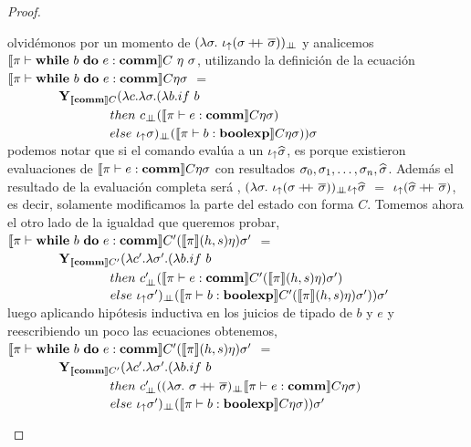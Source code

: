 \begin{proof}
\begin{itemize}
\begin{itemize}
olvid\'emonos por un momento de $(\lambda \sigma. \ \iota_{\uparrow} (\sigma +\kern-1.3ex+\kern0.8ex \overline{\sigma}))_{\bot \!\!\! \bot}$
y analicemos $\llbracket \pi \vdash \textbf{while} \ b \ \textbf{do} \ e : \textbf{comm} \rrbracket C \ \eta \ \sigma$, utilizando
la definici\'on de la ecuaci\'on\\

$\llbracket \pi \vdash \textbf{while} \ b \ \textbf{do} \ e : \textbf{comm} \rrbracket C \eta \sigma$ $=$ \\
\indent \ \ \ \ \ \ \ \
$\textbf{Y}_{\llbracket \textbf{comm} \rrbracket C} (\lambda c . \lambda \sigma . (\lambda b . if \ b$ \\
\indent \ \ \ \ \ \ \ \ \ \ \ \ \ \ \ \
$then \ c_{\dbot}(\semBrcks{\pi \vdash e : \commt}C \eta \sigma)$ \\
\indent \ \ \ \ \ \ \ \ \ \ \ \ \ \ \ \
$else \ \iota_{\uparrow} \sigma)_{\bot \!\!\! \bot} (\llbracket \pi \vdash b : \textbf{boolexp} \rrbracket C\eta\sigma))\sigma$ \\

podemos notar que si el comando eval\'ua a un $\iota_{\uparrow}\widehat{\sigma}$, es porque 
existieron evaluaciones de $\llbracket \pi \vdash e : \textbf{comm} \rrbracket C \eta \sigma$
con resultados $\sigma_0, \sigma_1, \ldots, \sigma_n, \widehat{\sigma}$. Adem\'as 
el resultado de la evaluaci\'on completa ser\'a ,
$(\lambda \sigma. \ \iota_{\uparrow} (\sigma +\kern-1.3ex+\kern0.8ex \overline{\sigma}))_{\bot \!\!\! \bot} \iota_{\uparrow} \widehat{\sigma}$ $=$
$\iota_{\uparrow} (\widehat{\sigma} +\kern-1.3ex+\kern0.8ex \overline{\sigma})$, es decir, solamente modificamos la parte del estado
con forma $C$. Tomemos ahora el otro lado de la igualdad que queremos probar,\\

$\llbracket \pi \vdash \textbf{while} \ b \ \textbf{do} \ e : \textbf{comm} \rrbracket C' (\llbracket \pi \rrbracket(h,s)\eta) \sigma'$ $=$ \\
\indent \ \ \ \ \ \ \ \
$\textbf{Y}_{\llbracket \textbf{comm} \rrbracket C'} (\lambda c' . \lambda \sigma' . (\lambda b . if \ b$ \\
\indent \ \ \ \ \ \ \ \ \ \ \ \ \ \ \ \
$then \ c'_{\dbot}(\semBrcks{\pi \vdash e : \commt}C'(\semBrcks{\pi}(h,s)\eta) \sigma')$ \\
\indent \ \ \ \ \ \ \ \ \ \ \ \ \ \ \ \
$else \ \iota_{\uparrow} \sigma')_{\bot \!\!\! \bot} 
	(\llbracket \pi \vdash b : \textbf{boolexp} \rrbracket C'(\llbracket \pi \rrbracket(h,s)\eta)\sigma'))\sigma'$ \\

luego aplicando hip\'otesis inductiva en los juicios de tipado de $b$ y $e$ y reescribiendo
un poco las ecuaciones obtenemos,\\

$\llbracket \pi \vdash \textbf{while} \ b \ \textbf{do} \ e : \textbf{comm} \rrbracket C' (\llbracket \pi \rrbracket(h,s)\eta) \sigma'$ $=$ \\
\indent \ \ \ \ \ \ \ \
$\textbf{Y}_{\llbracket \textbf{comm} \rrbracket C'} (\lambda c' . \lambda \sigma' . (\lambda b . if \ b$ \\
\indent \ \ \ \ \ \ \ \ \ \ \ \ \ \ \ \
$then \ c'_{\dbot}((\lambda \sigma. \ \sigma \concat \sigmaover)_{\dbot}
					\semBrcks{\pi \vdash e : \commt}C \eta \sigma)$ \\
\indent \ \ \ \ \ \ \ \ \ \ \ \ \ \ \ \
$else \ \iota_{\uparrow} \sigma')_{\bot \!\!\! \bot} 
	(\llbracket \pi \vdash b : \textbf{boolexp} \rrbracket C \eta \sigma))\sigma'$ \\
	

\end{itemize}
\end{itemize}
\end{proof}

